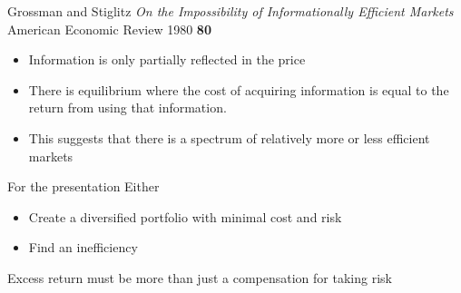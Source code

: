 \documentclass[14pt,xcolor=pdftex,dvipsnames,table]{beamer}
\begin{document}
\begin{frame}{Grossman and Stiglitz}
\emph{On the Impossibility of Informationally Efficient Markets}\\
American Economic Review 1980 \textbf{80}
\begin{itemize}[<+-| alert@+>]
\pause
\item Information is only partially reflected in the price
\item There is equilibrium where the cost of acquiring information is equal to the return from using that information. 
\item This suggests that there is a spectrum of relatively more or less efficient markets
\end{itemize}
\end{frame}

\begin{frame}{For the presentation}
Either
\pause
\begin{itemize}[<+-| alert@+>]
\item Create a diversified portfolio with minimal cost and risk
\item Find an inefficiency
\end{itemize}
\pause
\begin{block}{}
Excess return must be more than just a compensation for taking risk
\end{block}
\end{frame}
\end{document}
